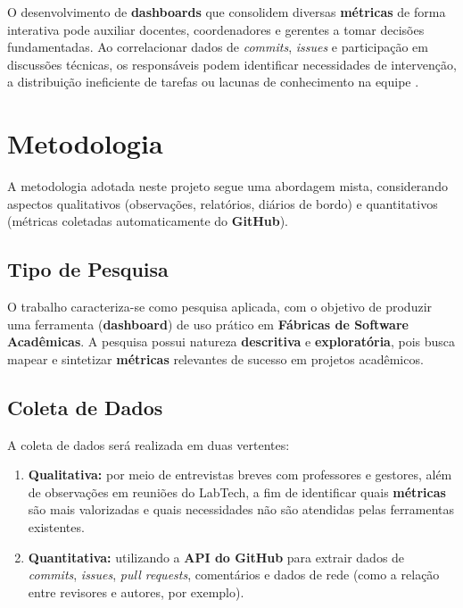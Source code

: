 \documentclass[
	12pt,           %
	openright,      %
	oneside,        %
	a4paper,        %
	brazil          %
]{abntex2}
\begin{document}
O desenvolvimento de \textbf{dashboards} que consolidem diversas \textbf{métricas} de forma interativa pode auxiliar docentes, coordenadores e gerentes a tomar decisões fundamentadas. Ao correlacionar dados de \emph{commits}, \emph{issues} e participação em discussões técnicas, os responsáveis podem identificar necessidades de intervenção, a distribuição ineficiente de tarefas ou lacunas de conhecimento na equipe \cite{kitchenham2010s}.

\section{Metodologia}

A metodologia adotada neste projeto segue uma abordagem mista, considerando aspectos qualitativos (observações, relatórios, diários de bordo) e quantitativos (métricas coletadas automaticamente do \textbf{GitHub}).

\subsection{Tipo de Pesquisa}
O trabalho caracteriza-se como pesquisa aplicada, com o objetivo de produzir uma ferramenta (\textbf{dashboard}) de uso prático em \textbf{Fábricas de Software Acadêmicas}. A pesquisa possui natureza \textbf{descritiva} e \textbf{exploratória}, pois busca mapear e sintetizar \textbf{métricas} relevantes de sucesso em projetos acadêmicos.

\subsection{Coleta de Dados}
A coleta de dados será realizada em duas vertentes:
\begin{enumerate}
    \item \textbf{Qualitativa:} por meio de entrevistas breves com professores e gestores, além de observações em reuniões do LabTech, a fim de identificar quais \textbf{métricas} são mais valorizadas e quais necessidades não são atendidas pelas ferramentas existentes.
    \item \textbf{Quantitativa:} utilizando a \textbf{API do GitHub} para extrair dados de \emph{commits}, \emph{issues}, \emph{pull requests}, comentários e dados de rede (como a relação entre revisores e autores, por exemplo).
\end{enumerate}
\end{document}

